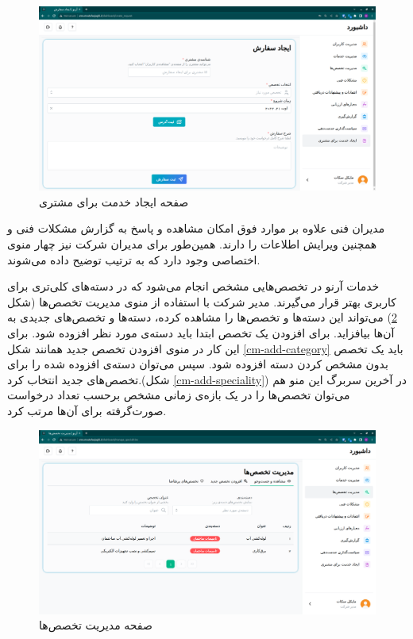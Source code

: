 \begin{figure}[h]
	\centering
	\includegraphics[width=\textwidth]{figs/user-guide/cm-create-request}
	\caption{صفحه ایجاد خدمت برای مشتری}
	\label{create-request-for-user}
\end{figure}

\FloatBarrier

مدیران فنی علاوه بر موارد فوق امکان مشاهده و پاسخ به گزارش مشکلات فنی و همچنین ویرایش اطلاعات را دارند.
همین‌طور برای مدیران شرکت نیز چهار منوی اختصاصی وجود دارد که به ترتیب توضیح داده می‌شوند.

خدمات آرنو در تخصص‌هایی مشخص انجام می‌شود که در دسته‌های کلی‌تری برای کاربری بهتر قرار می‌گیرند.
مدیر شرکت با استفاده از منوی مدیریت تخصص‌ها (شکل \ref{cm-manage-specialities})  می‌تواند این دسته‌ها و تخصص‌ها را مشاهده کرده، دسته‌ها و تخصص‌های جدیدی به آن‌ها بیافزاید.
برای افزودن یک تخصص ابتدا باید دسته‌ی مورد نظر افزوده شود. برای این کار در منوی افزودن تخصص جدید همانند شکل \ref{cm-add-category} باید یک تخصص بدون مشخص کردن دسته افزوده شود.
سپس می‌توان دسته‌ی افزوده شده را برای تخصص‌های جدید انتخاب کرد.(شکل \ref{cm-add-speciality})
در آخرین سربرگ این منو هم می‌توان تخصص‌ها را در یک بازه‌ی زمانی مشخص برحسب تعداد درخواست صورت‌گرفته برای آن‌ها مرتب کرد.

\begin{figure}[h]
	\centering
	\includegraphics[width=\textwidth]{figs/user-guide/cm-manage-specialities}
	\caption{صفحه مدیریت تخصص‌ها}
	\label{cm-manage-specialities}
\end{figure}

